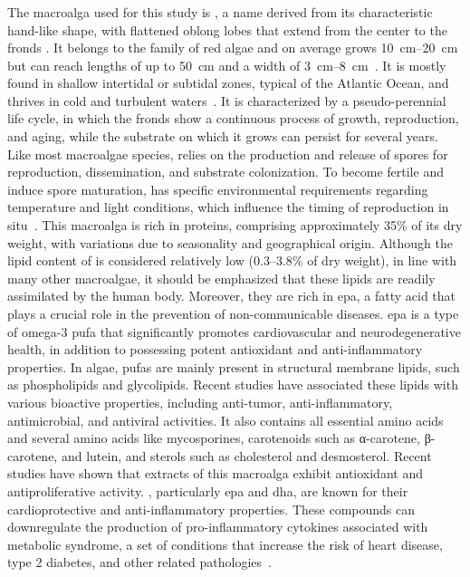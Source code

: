 \subsubsection{}
The macroalga used for this study is , a name derived from its characteristic hand-like shape, with flattened oblong lobes that extend from the center to the fronds . It belongs to the family of red algae and on average grows \qtyrange{10}{20}{\centi\metre} but can reach lengths of up to \qty{50}{\centi\metre} and a width of \qtyrange{3}{8}{\centi\metre}~\parencite{stevant_Concise_2023}. It is mostly found in shallow intertidal or subtidal zones, typical of the Atlantic Ocean, and thrives in cold and turbulent waters~\parencite{mouritsen_human_2013}. It is characterized by a pseudo-perennial life cycle, in which the fronds show a continuous process of growth, reproduction, and aging, while the substrate on which it grows can persist for several years. Like most macroalgae species,  relies on the production and release of spores for reproduction, dissemination, and substrate colonization. To become fertile and induce spore maturation,  has specific environmental requirements regarding temperature and light conditions, which influence the timing of reproduction in situ~\parencite{stevant_Concise_2023}. This macroalga is rich in proteins, comprising approximately 35\% of its dry weight, with variations due to seasonality and geographical origin. Although the lipid content of  is considered relatively low (\numrange{0.3}{3.8}\% of dry weight), in line with many other macroalgae, it should be emphasized that these lipids are readily assimilated by the human body. Moreover, they are rich in \gls{epa}, a fatty acid that plays a crucial role in the prevention of non-communicable diseases. \gls{epa} is a type of omega-3 \gls{pufa} that significantly promotes cardiovascular and neurodegenerative health, in addition to possessing potent antioxidant and anti-inflammatory properties. In algae, \glspl{pufa} are mainly present in structural membrane lipids, such as phospholipids and glycolipids. Recent studies have associated these lipids with various bioactive properties, including anti-tumor, anti-inflammatory, antimicrobial, and antiviral activities. It also contains all essential amino acids and several amino acids like mycosporines, carotenoids such as α-carotene, β-carotene, and lutein, and sterols such as cholesterol and desmosterol. Recent studies have shown that extracts of this macroalga exhibit antioxidant and antiproliferative activity. , particularly \gls{epa} and \gls{dha}, are known for their cardioprotective and anti-inflammatory properties. These compounds can downregulate the production of pro-inflammatory cytokines associated with metabolic syndrome, a set of conditions that increase the risk of heart disease, type 2 diabetes, and other related pathologies~\parencite{lopes_New_2019}.

